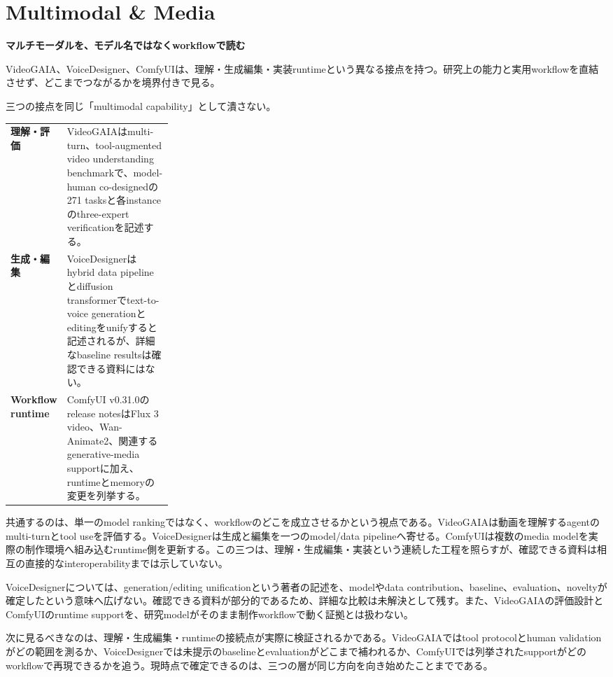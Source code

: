 \section{Multimodal \& Media}
\begin{wideflow}
{\Large\bfseries マルチモーダルを、モデル名ではなくworkflowで読む}\par
\smallskip
{\color{SurveyMuted}VideoGAIA、VoiceDesigner、ComfyUIは、理解・生成編集・実装runtimeという異なる接点を持つ。研究上の能力と実用workflowを直結させず、どこまでつながるかを境界付きで見る。}\par
\end{wideflow}

三つの接点を同じ「multimodal capability」として潰さない。

\begin{themeoverview}
\begin{tabularx}{\linewidth}{@{}>{\bfseries}p{0.27\linewidth}X@{}}
理解・評価 & VideoGAIAはmulti-turn、tool-augmented video understanding benchmarkで、model-human co-designedの271 tasksと各instanceのthree-expert verificationを記述する\cite{videogaia}。\\
生成・編集 & VoiceDesignerはhybrid data pipelineとdiffusion transformerでtext-to-voice generationとeditingをunifyすると記述されるが、詳細なbaseline resultsは確認できる資料にはない\cite{voicedesigner}。\\
Workflow runtime & ComfyUI v0.31.0のrelease notesはFlux 3 video、Wan-Animate2、関連するgenerative-media supportに加え、runtimeとmemoryの変更を列挙する\cite{comfyui}。
\end{tabularx}
\end{themeoverview}

共通するのは、単一のmodel rankingではなく、workflowのどこを成立させるかという視点である。VideoGAIAは動画を理解するagentのmulti-turnとtool useを評価する。VoiceDesignerは生成と編集を一つのmodel/data pipelineへ寄せる。ComfyUIは複数のmedia modelを実際の制作環境へ組み込むruntime側を更新する。この三つは、理解・生成編集・実装という連続した工程を照らすが、確認できる資料は相互の直接的なinteroperabilityまでは示していない。

\begin{claimboundary}[接続を急がない]
VoiceDesignerについては、generation/editing unificationという著者の記述を、modelやdata contribution、baseline、evaluation、noveltyが確定したという意味へ広げない。確認できる資料が部分的であるため、詳細な比較は未解決として残す。また、VideoGAIAの評価設計とComfyUIのruntime supportを、研究modelがそのまま制作workflowで動く証拠とは扱わない。
\end{claimboundary}

次に見るべきなのは、理解・生成編集・runtimeの接続点が実際に検証されるかである。VideoGAIAではtool protocolとhuman validationがどの範囲を測るか、VoiceDesignerでは未提示のbaselineとevaluationがどこまで補われるか、ComfyUIでは列挙されたsupportがどのworkflowで再現できるかを追う。現時点で確定できるのは、三つの層が同じ方向を向き始めたことまでである。
